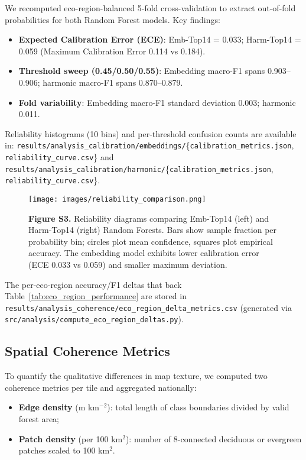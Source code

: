 \documentclass[utf8]{frontiers_suppmat}
\begin{document}
We recomputed eco-region-balanced 5-fold cross-validation to extract out-of-fold probabilities for both Random Forest models. Key findings:

\begin{itemize}
    \item \textbf{Expected Calibration Error (ECE)}: Emb-Top14 = 0.033; Harm-Top14 = 0.059 (Maximum Calibration Error 0.114 vs 0.184).
    \item \textbf{Threshold sweep (0.45/0.50/0.55)}: Embedding macro-F1 spans 0.903–0.906; harmonic macro-F1 spans 0.870–0.879.
    \item \textbf{Fold variability}: Embedding macro-F1 standard deviation 0.003; harmonic 0.011.
\end{itemize}

Reliability histograms (10 bins) and per-threshold confusion counts are available in: \texttt{results/analysis\_calibration/embeddings/}\{\texttt{calibration\_metrics.json}, \texttt{reliability\_curve.csv}\} and \texttt{results/analysis\_calibration/harmonic/}\{\texttt{calibration\_metrics.json}, \texttt{reliability\_curve.csv}\}.

\begin{figure}[H]
    \centering
    \texttt{[image: images/reliability\_comparison.png]}
    \caption{\textbf{Figure S3.} Reliability diagrams comparing Emb-Top14 (left) and Harm-Top14 (right) Random Forests. Bars show sample fraction per probability bin; circles plot mean confidence, squares plot empirical accuracy. The embedding model exhibits lower calibration error (ECE 0.033 vs 0.059) and smaller maximum deviation.}
    \label{fig:reliability}
\end{figure}

The per-eco-region accuracy/F1 deltas that back Table~\ref{tab:eco_region_performance} are stored in \texttt{results/analysis\_coherence/eco\_region\_delta\_metrics.csv} (generated via \texttt{src/analysis/compute\_eco\_region\_deltas.py}).

\subsection{Spatial Coherence Metrics}

To quantify the qualitative differences in map texture, we computed two coherence metrics per tile and aggregated nationally:
\begin{itemize}
    \item \textbf{Edge density} (m km$^{-2}$): total length of class boundaries divided by valid forest area;
    \item \textbf{Patch density} (per 100 km$^{2}$): number of 8-connected deciduous or evergreen patches scaled to 100 km$^{2}$.
\end{itemize}
\end{document}

